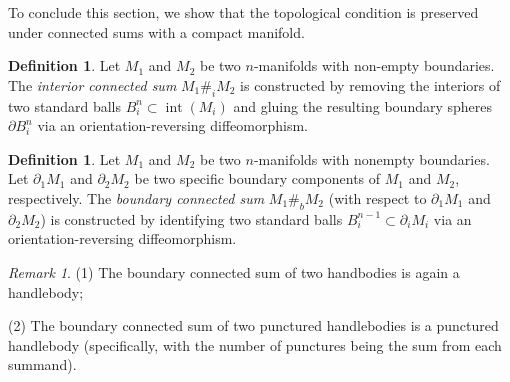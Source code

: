 \documentclass[11pt,letterpaper]{amsart}
\theoremstyle{definition}
\newtheorem{definition}[theorem]{Definition}
\theoremstyle{remark}
\newtheorem{remark}[theorem]{Remark}
\numberwithin{equation}{section}
\begin{document}
To conclude this section, we show that the topological condition is preserved under connected sums with a compact manifold.



\begin{definition}\label{interior connected sum}
Let $M_1$ and $M_2$ be two $n$-manifolds with non-empty boundaries. The \textit{interior connected sum} $M_1\#_i M_2$ is constructed by removing the interiors of two standard balls $B_i^n \subset \operatorname{int}(M_i)$ and gluing the resulting boundary spheres $\partial B_i^n$ via an orientation-reversing diffeomorphism.
\end{definition}


\begin{definition}\label{boundary connected sum}
Let $M_1$ and $M_2$ be two $n$-manifolds with nonempty boundaries. Let $\partial_1 M_1$ and $\partial_2 M_2$ be two specific boundary components of $M_1$ and $M_2$, respectively. The \textit{boundary connected sum} $M_1\#_b M_2$ (with respect to $\partial_1M_1$ and $\partial_2 M_2$) is constructed by identifying two standard balls $B_i^{n-1}\subset \partial_i M_i$ via an orientation-reversing diffeomorphism.
\end{definition}

\begin{remark}
    (1) The boundary connected sum of two handbodies is again a handlebody;
    
    (2) The boundary connected sum of two punctured handlebodies is a punctured handlebody (specifically, with the number of punctures being the sum from each summand).
\end{remark}
\end{document}
